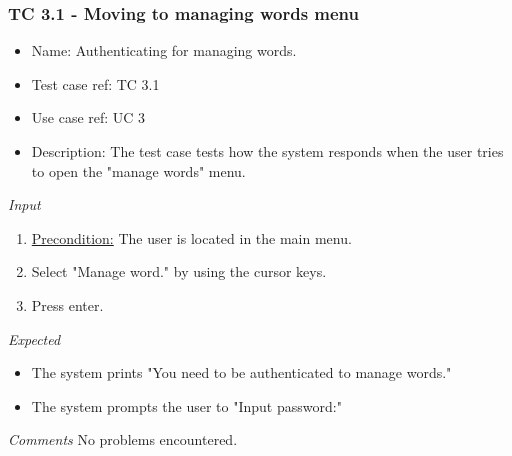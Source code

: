 \documentclass[12pt, letterpaper]{article}
\begin{document}
\subsubsection{TC 3.1 - Moving to managing words menu}
\begin{itemize}
	\item Name: Authenticating for managing words.
	\item Test case ref: TC 3.1
	\item Use case ref: UC 3
	\item Description: The test case tests how the system responds when the user tries to open the "manage words" menu.
\end{itemize}
\emph{Input}
\begin{enumerate}
	\item \underline{Precondition:} The user is located in the main menu.
	\item Select "Manage word." by using the cursor keys.
	\item Press enter.
\end{enumerate}
\emph{Expected}
\begin{itemize}
	\item The system prints "You need to be authenticated to manage words."
	\item The system prompts the user to "Input password:"
\end{itemize}
\begin{Form}
	\newline
	\newline
\end{Form}
\newline
\emph{Comments}
No problems encountered.
\end{document}
